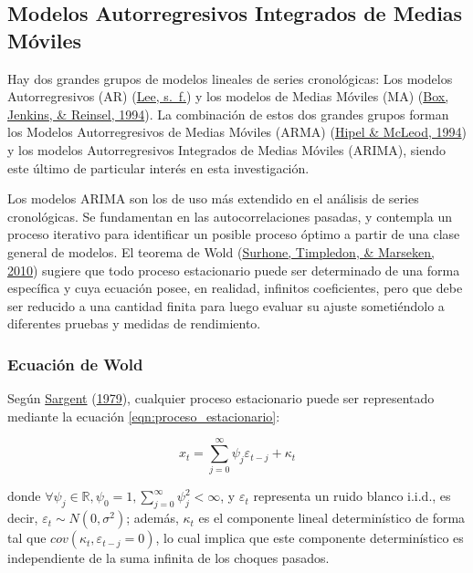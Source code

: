 \documentclass[
]{article}
\begin{document}
\subsection{Modelos Autorregresivos Integrados de Medias Móviles}

Hay dos grandes grupos de modelos lineales de series cronológicas: Los
modelos Autorregresivos (AR) (\protect\hyperlink{ref-Lee}{Lee, s.~f.}) y
los modelos de Medias Móviles (MA)
(\protect\hyperlink{ref-box-jenkins}{Box, Jenkins, \& Reinsel, 1994}).
La combinación de estos dos grandes grupos forman los Modelos
Autorregresivos de Medias Móviles (ARMA)
(\protect\hyperlink{ref-Hipel}{Hipel \& McLeod, 1994}) y los modelos
Autorregresivos Integrados de Medias Móviles (ARIMA), siendo este último
de particular interés en esta investigación.

Los modelos ARIMA son los de uso más extendido en el análisis de series
cronológicas. Se fundamentan en las autocorrelaciones pasadas, y
contempla un proceso iterativo para identificar un posible proceso
óptimo a partir de una clase general de modelos. El teorema de Wold
(\protect\hyperlink{ref-Wold}{Surhone, Timpledon, \& Marseken, 2010})
sugiere que todo proceso estacionario puede ser determinado de una forma
específica y cuya ecuación posee, en realidad, infinitos coeficientes,
pero que debe ser reducido a una cantidad finita para luego evaluar su
ajuste sometiéndolo a diferentes pruebas y medidas de rendimiento.

\subsubsection{Ecuación de Wold}

Según \protect\hyperlink{ref-sargent_macro}{Sargent}
(\protect\hyperlink{ref-sargent_macro}{1979}), cualquier proceso
estacionario puede ser representado mediante la ecuación
\ref{eqn:proceso_estacionario}:

\begin{equation}
\label{eqn:proceso_estacionario}
x_t=\sum_{j=0}^{\infty} \psi_j\varepsilon_{t-j}+\kappa_t
\end{equation}

donde
\(\forall \psi_j \in \mathbb{R}, \psi_0=1, \sum_{j=0}^{\infty} \psi_j^2<\infty\),
y \(\varepsilon_t\) representa un ruido blanco i.i.d., es decir,
\(\varepsilon_t \sim N(0, \sigma^2)\); además, \(\kappa_t\) es el
componente lineal determinístico de forma tal que
\(cov(\kappa_t,\varepsilon_{t-j}=0)\), lo cual implica que este
componente determinístico es independiente de la suma infinita de los
choques pasados.
\end{document}
